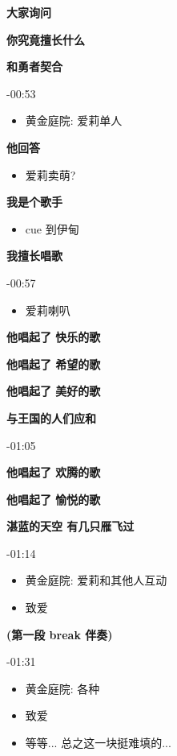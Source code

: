 \documentclass[a4paper]{article}
\begin{document}
\textbf{大家询问}

\textbf{你究竟擅长什么}

\textbf{和勇者契合}

-00:53

\begin{itemize}
    \item 黄金庭院: 爱莉单人
\end{itemize}

\textbf{他回答}

\begin{itemize}
    \item 爱莉卖萌?
\end{itemize}

\textbf{我是个歌手}

\begin{itemize}
    \item cue 到伊甸
\end{itemize}

\textbf{我擅长唱歌}

-00:57

\begin{itemize}
    \item 爱莉喇叭
\end{itemize}

\textbf{他唱起了 快乐的歌}

\textbf{他唱起了 希望的歌}

\textbf{他唱起了 美好的歌}

\textbf{与王国的人们应和}

-01:05

\textbf{他唱起了 欢腾的歌}

\textbf{他唱起了 愉悦的歌}

\textbf{湛蓝的天空 有几只雁飞过}

-01:14

\begin{itemize}
    \item 黄金庭院: 爱莉和其他人互动
    \item 致爱
\end{itemize}

\textbf{(第一段 break 伴奏)}

-01:31

\begin{itemize}
    \item 黄金庭院: 各种
    \item 致爱
    \item 等等... 总之这一块挺难填的...
\end{itemize}
\end{document}
